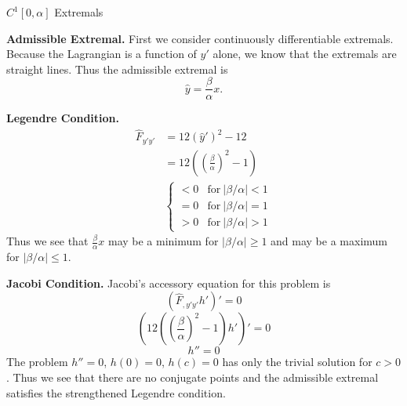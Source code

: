



\begin{Solution}
  \begin{description}
  \item{$C^1[0,\alpha]$ Extremals}

    \textbf{Admissible Extremal.}
    First we consider continuously differentiable extremals.  Because the 
    Lagrangian is a function of $y'$ alone, we know that the extremals are
    straight lines.  Thus the admissible extremal is
    \[
    \hat{y} = \frac{\beta}{\alpha} x.
    \]


    \textbf{Legendre Condition.}
    \begin{align*}
      \hat{F}_{y'y'}
      &= 12 (\hat{y}')^2 - 12 \\
      &= 12 \left( \left( \frac{\beta}{\alpha} \right)^2 - 1 \right) \\
      &\begin{cases}
        < 0 &\mathrm{for}\ |\beta/\alpha| < 1 \\
        = 0 &\mathrm{for}\ |\beta/\alpha| = 1 \\
        > 0 &\mathrm{for}\ |\beta/\alpha| > 1
      \end{cases}
    \end{align*}
    Thus we see that $\frac{\beta}{\alpha} x$ may be a minimum for 
    $|\beta/\alpha| \geq 1$ and may be a maximum for $|\beta/\alpha| \leq 1$.


    \textbf{Jacobi Condition.}
    Jacobi's accessory equation for this problem is
    \[
    (\hat{F}_{,y'y'} h')' = 0
    \]
    \[
    \left( 12 \left( \left( \frac{\beta}{\alpha} \right)^2 - 1 \right) 
      h' \right)' = 0
    \]
    \[
    h'' = 0
    \]
    The problem $h'' = 0$, $h(0) = 0$, $h(c) = 0$ has only the trivial solution
    for $c > 0$.  Thus we see that there are no conjugate points and the
    admissible extremal satisfies the strengthened Legendre condition.

    \begin{center}
    \end{center}




\end{description}
\end{Solution}
